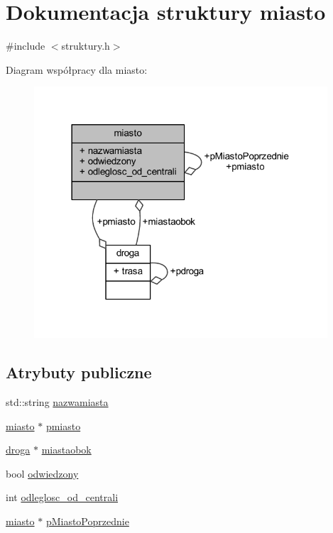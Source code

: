 \hypertarget{structmiasto}{}\section{Dokumentacja struktury miasto}
\label{structmiasto}


{\ttfamily \#include $<$struktury.\+h$>$}



Diagram współpracy dla miasto\+:\nopagebreak
\begin{figure}[H]
\begin{center}
\leavevmode
\includegraphics[width=310pt]{structmiasto__coll__graph}
\end{center}
\end{figure}
\subsection*{Atrybuty publiczne}
\begin{DoxyCompactItemize}
\item 
std\+::string \mbox{\hyperlink{structmiasto_a75a023beb08b889860c2068ffd47318e}{nazwamiasta}}
\item 
\mbox{\hyperlink{structmiasto}{miasto}} $\ast$ \mbox{\hyperlink{structmiasto_a9cd7b8d4e3e00ba833d3149b76a918f9}{pmiasto}}
\item 
\mbox{\hyperlink{structdroga}{droga}} $\ast$ \mbox{\hyperlink{structmiasto_af69437beea5c134e233947df273a48a4}{miastaobok}}
\item 
bool \mbox{\hyperlink{structmiasto_a7a2028174edb36e184c06d084d02ef27}{odwiedzony}}
\item 
int \mbox{\hyperlink{structmiasto_a0c3b5abe9b7ab0df2ceb80f9bd3faec3}{odleglosc\+\_\+od\+\_\+centrali}}
\item 
\mbox{\hyperlink{structmiasto}{miasto}} $\ast$ \mbox{\hyperlink{structmiasto_a8238eaa6785b35e180170ae00996e515}{p\+Miasto\+Poprzednie}}
\end{DoxyCompactItemize}


